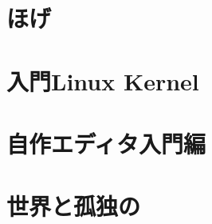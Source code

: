 \documentclass[autodetect-engine,dvipdfmx-if-dvi,ja=standard,a4paper,12pt,twoside,openany,layout=v2]{bxjsbook}
\begin{document}
\chapter{ほげ}


\chapter{入門Linux Kernel}


\chapter{自作エディタ入門編}


\chapter{世界と孤独の}


\newpage
\myimpression
\end{document}
